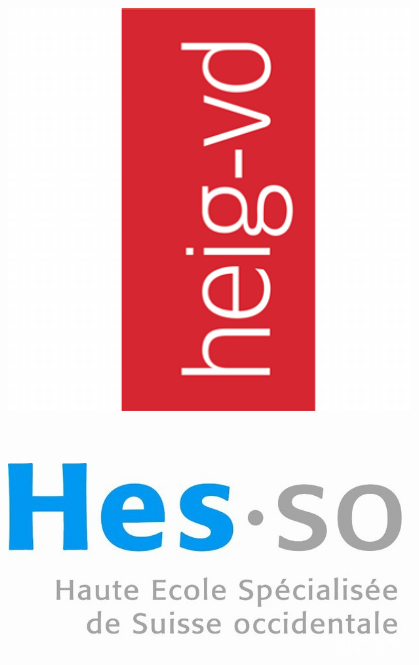 \begin{titlepage}

\begin{minipage}{0.4\textwidth}
\begin{flushleft}
\includegraphics[width=0.8\textwidth]{pageGarde/logo}~
\end{flushleft}
\end{minipage} 
~
\begin{minipage}{0.4\textwidth}
\begin{flushright}
\includegraphics[width=0.8\textwidth]{pageGarde/logo_hes}~
\end{flushright}
\end{minipage}\\[3cm]

\begin{center}

\textsc{\Large\theCours} \\[0.2cm]
{\large\theAcro} \\[1cm]
\HRule \\[0.5cm]
\textsc{\huge \thetitle} \\[0.2cm]
\textsc{\Large \thesubtitle}\\[0.3cm]
\HRule \\[1cm]
{\large\theauthor} \\[2cm]
\end{center}


\end{titlepage}
